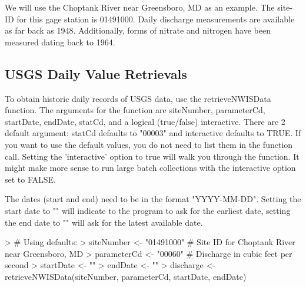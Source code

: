 \documentclass[a4paper,11pt]{article}
\begin{document}
We will use the Choptank River near Greensboro, MD as an example.  The site-ID for this gage station is 01491000. Daily discharge measurements are available as far back as 1948.  Additionally, forms of nitrate and nitrogen have been measured dating back to 1964.

\subsection{USGS Daily Value Retrievals}
To obtain historic daily records of USGS data, use the retrieveNWISData function. The arguments for the function are siteNumber, parameterCd, startDate, endDate, statCd, and a logical (true/false) interactive. There are 2 default argument: statCd defaults to "00003" and interactive defaults to TRUE.  If you want to use the default values, you do not need to list them in the function call. Setting the 'interactive' option to true will walk you through the function. It might make more sense to run large batch collections with the interactive option set to FALSE.

The dates (start and end) need to be in the format "YYYY-MM-DD".  Setting the start date to "" will indicate to the program to ask for the earliest date, setting the end date to "" will ask for the latest available date.

\begin{Schunk}
\begin{Sinput}
> # Using defaults:
> siteNumber <- "01491000" # Site ID for Choptank River near Greensboro, MD
> parameterCd <- "00060"  # Discharge in cubic feet per second
> startDate <- ""
> endDate <- ""
> discharge <- retrieveNWISData(siteNumber, parameterCd, startDate, endDate)
\end{Sinput}
\end{Schunk}
\end{document}
